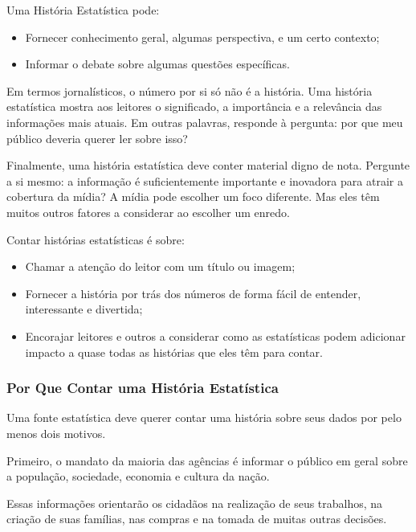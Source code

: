 Uma História Estatística pode:

\begin{itemize}
    \item Fornecer conhecimento geral, algumas perspectiva, e um certo contexto;
    \item Informar o debate sobre algumas questões específicas.
\end{itemize}


Em termos jornalísticos, o número por si só não é a história. Uma história estatística mostra aos leitores o significado, a importância e a relevância das informações mais atuais. Em outras palavras, responde à pergunta: por que meu público deveria querer ler sobre isso?\vskip0.3cm 

Finalmente, uma história estatística deve conter material digno de nota. Pergunte a si mesmo: a informação é suficientemente importante e inovadora para atrair a cobertura da mídia? A mídia pode escolher um foco diferente. Mas eles têm muitos outros fatores a considerar ao escolher um enredo.

Contar histórias estatísticas é sobre:

\begin{itemize}
    \item Chamar a atenção do leitor com um título ou imagem;
    \item Fornecer a história por trás dos números de forma fácil de entender, interessante e divertida;
    \item Encorajar leitores e outros a considerar como as estatísticas podem adicionar impacto a quase todas as histórias que eles têm para contar.
\end{itemize}



\newpage
\subsubsection{Por Que Contar uma História Estatística}

Uma fonte estatística deve querer contar uma história sobre seus dados por pelo menos dois motivos. \vskip0.3cm 

Primeiro, o mandato da maioria das agências é informar o público em geral sobre a população, sociedade, economia e cultura da nação.\vskip0.3cm 

Essas informações orientarão os cidadãos na realização de seus trabalhos, na criação de suas famílias, nas compras e na tomada de muitas outras decisões.\vskip0.3cm 


